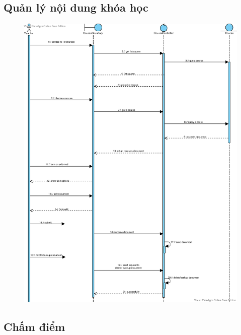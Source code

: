 \documentclass[./../main_file.tex]{subfiles}
\begin{document}
	\subsection{Quản lý nội dung khóa học }
	\begin{figure}[H]
		\centering
		\includegraphics[width=\linewidth]{./images/sequence_diagram/3_13_manage_contentcourse.eps}
	\end{figure}
	
	\subsection{Chấm điểm}
	
	
\end{document}
